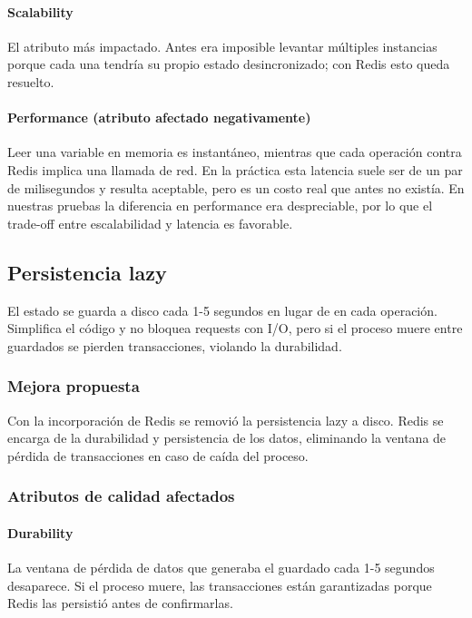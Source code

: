 \paragraph{Scalability}
El atributo más impactado. Antes era imposible levantar múltiples instancias porque cada una tendría su propio estado desincronizado; con Redis esto queda resuelto.

\paragraph{Performance (atributo afectado negativamente)}
Leer una variable en memoria es instantáneo, mientras que cada operación contra Redis implica una llamada de red. En la práctica esta latencia suele ser de un par de milisegundos y resulta aceptable, pero es un costo real que antes no existía. En nuestras pruebas la diferencia en performance era despreciable, por lo que el trade-off entre escalabilidad y latencia es favorable.

\subsection{Persistencia lazy}

El estado se guarda a disco cada 1-5 segundos en lugar de en cada operación. Simplifica el código y no bloquea requests con I/O, pero si el proceso muere entre guardados se pierden transacciones, violando la durabilidad.

\subsubsection{Mejora propuesta}

Con la incorporación de Redis se removió la persistencia lazy a disco. Redis se encarga de la durabilidad y persistencia de los datos, eliminando la ventana de pérdida de transacciones en caso de caída del proceso.

\subsubsection{Atributos de calidad afectados}

\paragraph{Durability}
La ventana de pérdida de datos que generaba el guardado cada 1-5 segundos desaparece. Si el proceso muere, las transacciones están garantizadas porque Redis las persistió antes de confirmarlas.

